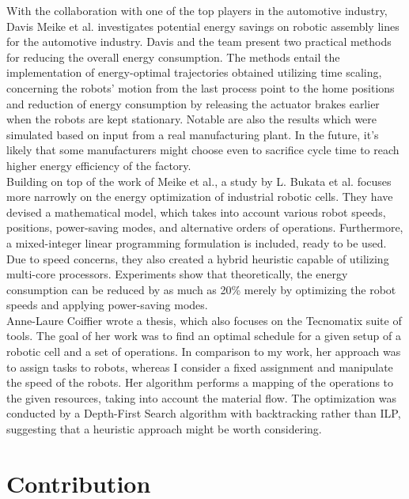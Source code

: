 With the collaboration with one of the top players in the automotive industry, Davis Meike et al. \cite{Meike8Percent} investigates potential energy savings on robotic assembly lines for the automotive industry. Davis and the team present two practical methods for reducing the overall energy consumption. The methods entail the implementation of energy-optimal trajectories obtained utilizing time scaling, concerning the robots' motion from the last process point to the home positions and reduction of energy consumption by releasing the actuator brakes earlier when the robots are kept stationary. Notable are also the results which were simulated based on input from a real manufacturing plant. In the future, it's likely that some manufacturers might choose even to sacrifice cycle time to reach higher energy efficiency of the factory. \\

Building on top of the work of Meike et al., a study by L. Bukata et al. \cite{EnergyOptimisationBukata} focuses more narrowly on the energy optimization of industrial robotic cells. They have devised a mathematical model, which takes into account various robot speeds, positions, power-saving modes, and alternative orders of operations. Furthermore, a mixed-integer linear programming formulation is included, ready to be used. Due to speed concerns, they also created a hybrid heuristic capable of utilizing multi-core processors. Experiments show that theoretically, the energy consumption can be reduced by as much as 20\% merely by optimizing the robot speeds and applying power-saving modes. \\

Anne-Laure Coiffier \cite{AnneBacktracking} wrote a thesis, which also focuses on the Tecnomatix suite of tools. The goal of her work was to find an optimal schedule for a given setup of a robotic cell and a set of operations. In comparison to my work, her approach was to assign tasks to robots, whereas I consider a fixed assignment and manipulate the speed of the robots. Her algorithm performs a mapping of the operations to the given resources, taking into account the material flow. The optimization was conducted by a Depth-First Search algorithm with backtracking rather than ILP, suggesting that a heuristic approach might be worth considering. \\

\section{Contribution}

